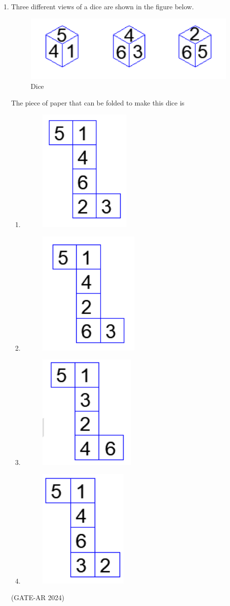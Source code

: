 \documentclass[a4paper,10pt]{article}
\begin{document}
\begin{enumerate}
    \item Three different views of a dice are shown in the figure below. \\
    \begin{figure}[h!]
    \centering
    \includegraphics[width=0.2\columnwidth]{figs/03.jpg}
    \caption{Dice}
    \label{fig:Img03}
    \end{figure}
    The piece of paper that can be folded to make this dice is
    \begin{enumerate}
        \item \begin{figure}[h!]
    \centering
    \includegraphics[width=0.12\columnwidth]{figs/04.jpg}
    \caption{}
    \label{fig:Img04}
    \end{figure}
        \item \begin{figure}[h!]
    \centering
    \includegraphics[width=0.12\columnwidth]{figs/05.jpg}
    \caption{}
    \label{fig:Img05}
    \end{figure}
        \item \begin{figure}[h!]
    \centering
    \includegraphics[width=0.12\columnwidth]{figs/06.jpg}
    \caption{}
    \label{fig:Img06}
    \end{figure}
        \item \begin{figure}[h!]
    \centering
    \includegraphics[width=0.12\columnwidth]{figs/07.jpg}
    \caption{}
    \label{fig:Img07}
    \end{figure}
    \end{enumerate}
    \hfill (GATE-AR 2024)
    

\end{enumerate}
\end{document}
